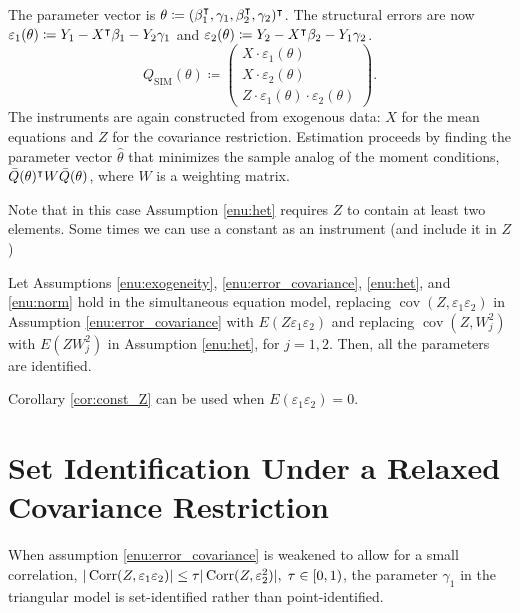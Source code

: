 The parameter vector is $\theta\coloneqq(\beta_{1}^{\intercal},\gamma_{1},\beta_{2}^{\intercal},\gamma_{2})^{\intercal}$.
The structural errors are now $\varepsilon_{1}(\theta)\coloneqq Y_{1}-X^{\intercal}\beta_{1}-Y_{2}\gamma_{1}$
and $\varepsilon_{2}(\theta)\coloneqq Y_{2}-X^{\intercal}\beta_{2}-Y_{1}\gamma_{2}$.
\begin{equation}
Q_{\text{SIM}}(\theta)\coloneqq\begin{pmatrix}X\cdot\varepsilon_{1}(\theta)\\[3pt]
X\cdot\varepsilon_{2}(\theta)\\[3pt]
Z\cdot\varepsilon_{1}(\theta)\cdot\varepsilon_{2}(\theta)
\end{pmatrix}.\label{eq:moment_sim}
\end{equation}
The instruments are again constructed from exogenous data: $X$ for
the mean equations and $Z$ for the covariance restriction. Estimation
proceeds by finding the parameter vector $\hat{\theta}$ that minimizes
the sample analog of the moment conditions, $\bar{Q}(\theta)^{\intercal} W\bar{Q}(\theta)$,
where $W$ is a weighting matrix.

Note that in this case Assumption \ref{enu:het} requires $Z$ to
contain at least two elements. Some times we can use a constant as
an instrument (and include it in $Z$)
\begin{cor}
\label{cor:const_Z}Let Assumptions \ref{enu:exogeneity}, \ref{enu:error_covariance},
\ref{enu:het}, and \ref{enu:norm} hold in the simultaneous equation
model, replacing $\operatorname{cov}(Z,\varepsilon_{1}\varepsilon_{2})$
in Assumption \ref{enu:error_covariance} with $E\left(Z\varepsilon_{1}\varepsilon_{2}\right)$
and replacing $\operatorname{cov}\left(Z,W_{j}^{2}\right)$ with $E\left(ZW_{j}^{2}\right)$
in Assumption \ref{enu:het}, for $j=1,2$. Then, all the parameters
are identified.
\end{cor}

Corollary \ref{cor:const_Z} can be used when $E\left(\varepsilon_{1}\varepsilon_{2}\right)=0$.

\section{Set Identification Under a Relaxed Covariance Restriction}

When assumption \ref{enu:error_covariance} is weakened to allow for
a small correlation, $|\operatorname{Corr}(Z,\varepsilon_{1}\varepsilon_{2})|\le\tau|\operatorname{Corr}(Z,\varepsilon_{2}^{2})|,\;\tau\in[0,1)$,
the parameter $\gamma_{1}$ in the triangular model is set-identified
rather than point-identified.

